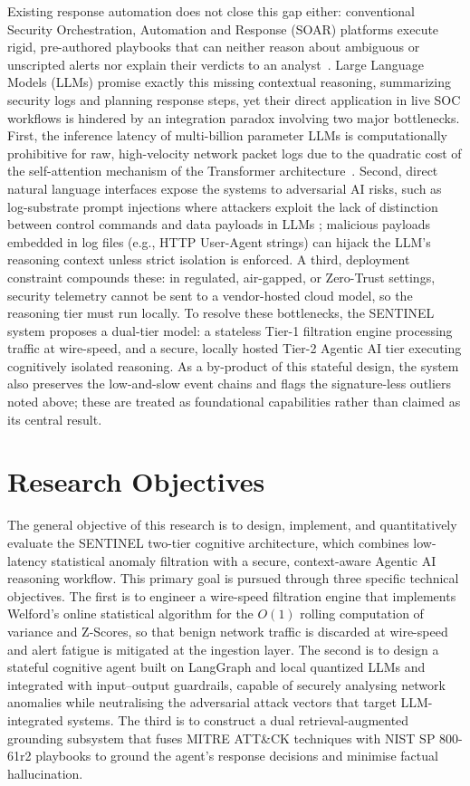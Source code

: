 Existing response automation does not close this gap either: conventional Security Orchestration, Automation and Response (SOAR) platforms execute rigid, pre-authored playbooks that can neither reason about ambiguous or unscripted alerts nor explain their verdicts to an analyst~\cite{soar2025}. Large Language Models (LLMs) promise exactly this missing contextual reasoning, summarizing security logs and planning response steps, yet their direct application in live SOC workflows is hindered by an integration paradox involving two major bottlenecks. First, the inference latency of multi-billion parameter LLMs is computationally prohibitive for raw, high-velocity network packet logs due to the quadratic cost of the self-attention mechanism of the Transformer architecture~\cite{vaswani2017}. Second, direct natural language interfaces expose the systems to adversarial AI risks, such as log-substrate prompt injections where attackers exploit the lack of distinction between control commands and data payloads in LLMs \cite{promptinjection2023}; malicious payloads embedded in log files (e.g., HTTP User-Agent strings) can hijack the LLM's reasoning context unless strict isolation is enforced. A third, deployment constraint compounds these: in regulated, air-gapped, or Zero-Trust settings, security telemetry cannot be sent to a vendor-hosted cloud model, so the reasoning tier must run locally. To resolve these bottlenecks, the SENTINEL system proposes a dual-tier model: a stateless Tier-1 filtration engine processing traffic at wire-speed, and a secure, locally hosted Tier-2 Agentic AI tier executing cognitively isolated reasoning. As a by-product of this stateful design, the system also preserves the low-and-slow event chains and flags the signature-less outliers noted above; these are treated as foundational capabilities rather than claimed as its central result.

\section{Research Objectives}

The general objective of this research is to design, implement, and quantitatively evaluate the SENTINEL two-tier cognitive architecture, which combines low-latency statistical anomaly filtration with a secure, context-aware Agentic AI reasoning workflow. This primary goal is pursued through three specific technical objectives. The first is to engineer a wire-speed filtration engine that implements Welford's online statistical algorithm for the $O(1)$ rolling computation of variance and Z-Scores, so that benign network traffic is discarded at wire-speed and alert fatigue is mitigated at the ingestion layer. The second is to design a stateful cognitive agent built on LangGraph and local quantized LLMs and integrated with input--output guardrails, capable of securely analysing network anomalies while neutralising the adversarial attack vectors that target LLM-integrated systems. The third is to construct a dual retrieval-augmented grounding subsystem that fuses MITRE ATT\&CK techniques with NIST SP 800-61r2 playbooks to ground the agent's response decisions and minimise factual hallucination.

